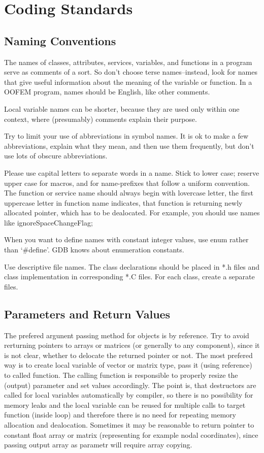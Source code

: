\documentclass[a4paper]{article}
\begin{document}
\section{Coding Standards}
\subsection{Naming Conventions}

The names of classes, attributes, services, variables, and functions
in a program serve as comments of a sort. So don't choose terse names--instead, look for names that give useful information about the meaning of the variable or function. In a OOFEM
program, names should be English, like other comments. 

Local variable names can be shorter, because they are used only within one context, where (presumably) comments explain
their purpose. 

Try to limit your use of abbreviations in symbol names. It is ok to make a few abbreviations, explain what they mean, and
then use them frequently, but don't use lots of obscure abbreviations. 

Please use capital letters to separate words in a name. Stick to
lower case; reserve upper case for macros, and for name-prefixes that
follow a uniform convention. The function or service name should always begin with lovercase
letter, the first uppercase letter in function name indicates, that
function is returning newly allocated pointer, which has to be dealocated.
For example, you should use names like ignoreSpaceChangeFlag; 

When you want to define names with constant integer values, use enum rather than `\#define'. GDB knows about
enumeration constants. 

Use descriptive file names. The class declarations should be placed in *.h files
and class implementation in corresponding *.C files. For each class, create a separate files.


\subsection{Parameters and Return Values}

The prefered argunent passing method for objects is by reference. 
Try to avoid rerturning pointers to arrays or matrices (or generally
to any component), since it is not clear, whether to delocate the
returned pointer or not. The most prefered way is to create local
variable of vector or matrix type, pass it (using reference) to called
function. The calling function is responsible to properly resize the
(output) parameter and set values accordingly. The point is, that
destructors are called for local variables automatically by compiler,
so there is no possibility for memory leaks and the local variable can
be reused for multiple calls to target function (inside loop) and
therefore there is no need for repeating memory allocation and
dealocation. Sometimes it may be reasonable to return pointer to
constant float array or matrix (representing for example
nodal coordinates), since passing output array as parametr will require 
array copying. 
\end{document}
